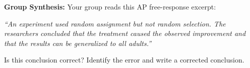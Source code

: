 \documentclass[10pt]{article}
\begin{document}
\vspace{0.12in}

\begin{practicebox}
\small
\textbf{Group Synthesis:} Your group reads this AP free-response excerpt:

\vspace{4pt}
\textit{``An experiment used random assignment but not random selection. The
researchers concluded that the treatment caused the observed improvement and that
the results can be generalized to all adults.''}

\vspace{6pt}
Is this conclusion correct? Identify the error and write a corrected conclusion.\\[6pt]
\\[1pt]\\[1pt]
\end{practicebox}
\end{document}
